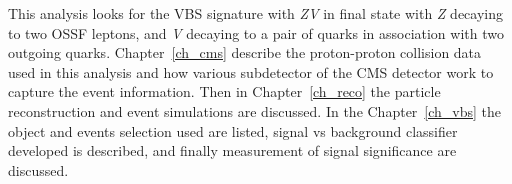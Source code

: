This analysis looks for the \gls{VBS} signature with \textit{ZV} in final state
with \textit{Z} decaying to two \gls{OSSF} leptons, and \textit{V} decaying to a pair
of quarks in association with two outgoing quarks. Chapter~\ref{ch_cms}
describe the proton-proton collision data used in this analysis and how
various subdetector of the \gls{CMS} detector work to capture the
event information. Then in Chapter~\ref{ch_reco} the particle
reconstruction and event simulations are discussed. In the
Chapter~\ref{ch_vbs} the object and events selection
used are listed, signal vs background classifier developed
is described, and finally measurement of signal significance are discussed.
